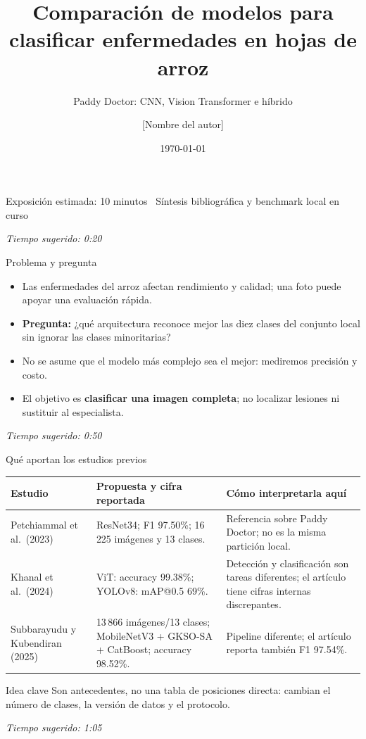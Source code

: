 \documentclass[aspectratio=169,11pt]{beamer}
\title{Comparación de modelos para clasificar enfermedades en hojas de arroz}
\subtitle{Paddy Doctor: CNN, Vision Transformer e híbrido}
\author{[Nombre del autor]}
\institute{[Institución]}
\date{\today}
\newcommand{\tiempo}[1]{\vfill\hfill\scriptsize\textit{Tiempo sugerido: #1}}
\begin{document}
\begin{frame}
    \titlepage
    \begin{center}
        \small Exposición estimada: 10 minutos \textbullet\ Síntesis bibliográfica y benchmark local en curso
    \end{center}
    \tiempo{0:20}
\end{frame}

\begin{frame}{Problema y pregunta}
    \begin{itemize}
        \item Las enfermedades del arroz afectan rendimiento y calidad; una foto puede apoyar una evaluación rápida.
        \item \textbf{Pregunta:} ¿qué arquitectura reconoce mejor las diez clases del conjunto local sin ignorar las clases minoritarias?
        \item No se asume que el modelo más complejo sea el mejor: mediremos precisión y costo.
        \item El objetivo es \textbf{clasificar una imagen completa}; no localizar lesiones ni sustituir al especialista.
    \end{itemize}
    \tiempo{0:50}
\end{frame}

\begin{frame}{Qué aportan los estudios previos}
    \small
    \begin{tabularx}{\textwidth}{p{3.3cm}p{4.0cm}Y}
        \toprule
        Estudio & Propuesta y cifra reportada & Cómo interpretarla aquí \\
        \midrule
        Petchiammal et al.\ (2023) & ResNet34; F1 97.50\%; 16\,225 imágenes y 13 clases. & Referencia sobre Paddy Doctor; no es la misma partición local. \\
        Khanal et al.\ (2024) & ViT: accuracy 99.38\%; YOLOv8: mAP@0.5 69\%. & Detección y clasificación son tareas diferentes; el artículo tiene cifras internas discrepantes. \\
        Subbarayudu y Kubendiran (2025) & 13\,866 imágenes/13 clases; MobileNetV3 + GKSO-SA + CatBoost; accuracy 98.52\%. & Pipeline diferente; el artículo reporta también F1 97.54\%. \\
        \bottomrule
    \end{tabularx}
    \vspace{0.25cm}
    \begin{block}{Idea clave}
        Son antecedentes, no una tabla de posiciones directa: cambian el número de clases, la versión de datos y el protocolo.
    \end{block}
    \tiempo{1:05}
\end{frame}
\end{document}
